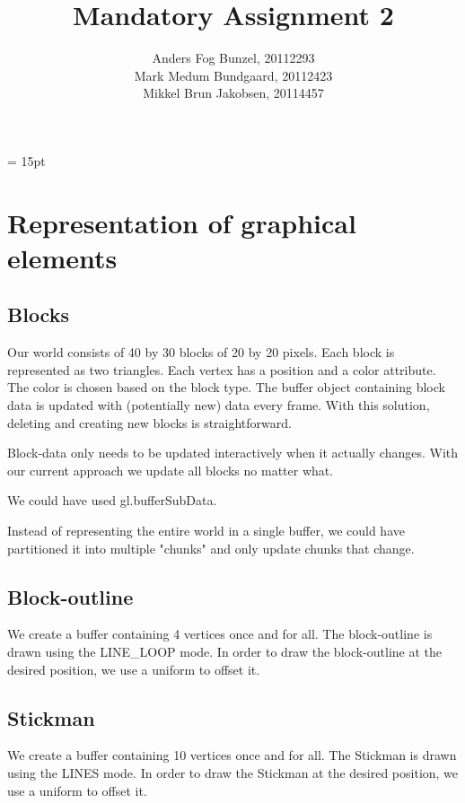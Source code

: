 \documentclass[12pt,leqno]{article}
\begin{document}
\title{Mandatory Assignment 2} 
\author{Anders Fog Bunzel, 20112293\\ Mark Medum Bundgaard, 20112423\\Mikkel Brun Jakobsen, 20114457}

\maketitle

\headheight = 15pt
\thispagestyle{fancy} 
\pagestyle{fancy} \lhead{
\date{\today}}   

\section{Representation of graphical elements}

\subsection{Blocks}
Our world consists of 40 by 30 blocks of 20 by 20 pixels.
Each block is represented as two triangles.
Each vertex has a position and a color attribute. The color is chosen based on the block type.
The buffer object containing block data is updated with (potentially new) data every frame. With this solution, deleting and creating new blocks is straightforward.

Block-data only needs to be updated interactively when it actually changes. With our current approach we update all blocks no matter what.

We could have used gl.bufferSubData.

Instead of representing the entire world in a single buffer, we could have partitioned it into multiple "chunks" and only update chunks that change.

\subsection{Block-outline}
We create a buffer containing 4 vertices once and for all.
The block-outline is drawn using the LINE\_LOOP mode.
In order to draw the block-outline at the desired position, we use a uniform to offset it.

\subsection{Stickman}
We create a buffer containing 10 vertices once and for all.
The Stickman is drawn using the LINES mode.
In order to draw the Stickman at the desired position, we use a uniform to offset it.
\end{document}

